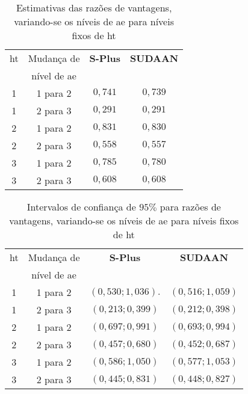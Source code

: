 \documentclass[]{book}
\begin{document}
\begin{center}
\begin{table}[tbp] \centering%
\caption{Estimativas das razões de vantagens, variando-se os níveis de ae
para níveis fixos de ht }\bigskip \label{tab64} 
\begin{tabular}{|c|c|c|c|}
\hline\hline
ht & Mudança de & \textbf{S-Plus} & \textbf{SUDAAN} \\ 
& nível de ae & \hspace{1cm}\quad \hspace{1cm} &  \\ \hline\hline
1 & 1 para 2 & $0,741$ & $0,739$ \\ 
1 & 2 para 3 & $0,291$ & $0,291$ \\ \hline
2 & 1 para 2 & $0,831$ & $0,830$ \\ 
2 & 2 para 3 & $0,558$ & $0,557$ \\ \hline
3 & 1 para 2 & $0,785$ & $0,780$ \\ 
3 & 2 para 3 & $0,608$ & $0,608$ \\ \hline\hline
\end{tabular}
\end{table}%

\begin{table}[tbp] \centering%
\caption{Intervalos de confiança de $95\%$ para razões de vantagens,
variando-se os níveis de ae para níveis fixos de ht}\bigskip \label{tab65} 
\begin{tabular}{|c|c|c|c|}
\hline\hline
ht & Mudança de & \textbf{S-Plus} & \textbf{SUDAAN} \\ 
& nível de ae & \hspace{1cm}\quad \hspace{1cm} &  \\ \hline\hline
1 & 1 para 2 & $(0,530;1,036).$ & $(0,516;1,059)$ \\ 
1 & 2 para 3 & $(0,213;0,399)$ & $(0,212;0,398)$ \\ \hline
2 & 1 para 2 & $(0,697;0,991)$ & $(0,693;0,994)$ \\ 
2 & 2 para 3 & $(0,457;0,680)$ & $(0,452;0,687)$ \\ \hline
3 & 1 para 2 & $(0,586;1,050)$ & $(0,577;1,053)$ \\ 
3 & 2 para 3 & $(0,445;0,831)$ & $(0,448;0,827)$ \\ \hline\hline
\end{tabular}
\end{table}%
\end{center}
\end{document}
